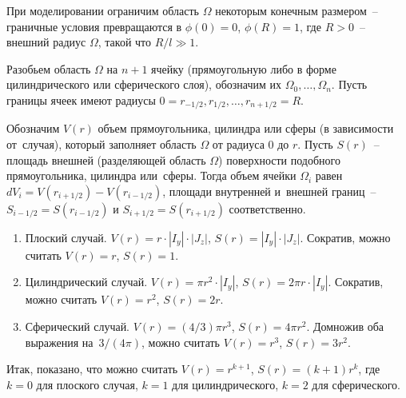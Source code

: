 При моделировании ограничим область $\Omega$ некоторым конечным размером~-- граничные условия превращаются в $\phi(0) = 0$, $\phi(R) = 1$, где $R > 0$~-- внешний радиус $\Omega$, такой что $R / l \gg 1$.

Разобьем область $\Omega$ на $n + 1$ ячейку (прямоугольную либо в форме цилиндрического или сферического слоя), обозначим их $\Omega_0, \dots, \Omega_n$. Пусть границы ячеек имеют радиусы $0 = r_{-1/2}, r_{1/2}, \dots, r_{n + 1/2} = R$.

Обозначим $V(r)$ объем прямоугольника, цилиндра или сферы (в зависимости от~случая), который заполняет область $\Omega$ от радиуса $0$ до $r$. Пусть $S(r)$~-- площадь внешней (разделяющей область $\Omega$) поверхности подобного прямоугольника, цилиндра или~сферы. Тогда объем ячейки $\Omega_i$ равен $dV_i = V(r_{i + 1/2}) - V(r_{i - 1/2})$, площади внутренней и~внешней границ~-- $S_{i - 1/2} = S(r_{i - 1/2})$ и $S_{i + 1/2} = S(r_{i + 1/2})$ соответственно.
\begin{enumerate}[label=\arabic*.]
    \item Плоский случай. $V(r) = r \cdot |I_y| \cdot |J_z|$, $S(r) = |I_y| \cdot |J_z|$. Сократив, можно считать $V(r) = r$, $S(r) = 1$.
    \item Цилиндрический случай. $V(r) = \pi r^2 \cdot |I_y|$, $S(r) = 2 \pi r \cdot |I_y|$. Сократив, можно считать $V(r) = r^2$, $S(r) = 2r$.
    \item Сферический случай. $V(r) = (4/3) \pi r^3$, $S(r) = 4 \pi r^2$. Домножив оба выражения на~$3/(4\pi)$, можно считать $V(r) = r^3$, $S(r) = 3 r^2$.
\end{enumerate}
Итак, показано, что можно считать $V(r) = r^{k + 1}$, $S(r) = (k + 1)r^k$, где $k = 0$ для плоского случая, $k = 1$ для цилиндрического, $k = 2$ для сферического.

